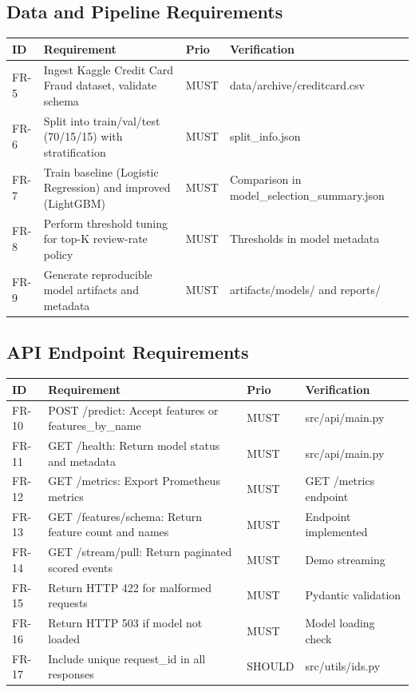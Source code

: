 \documentclass[12pt,a4paper]{article}
\begin{document}
\subsection{Data and Pipeline Requirements}

\begin{longtable}{|p{0.6cm}|p{3cm}|p{2cm}|p{3.5cm}|}
\hline
\textbf{ID} & \textbf{Requirement} & \textbf{Prio} & \textbf{Verification} \\
\hline
FR-5 & Ingest Kaggle Credit Card Fraud dataset, validate schema & MUST & data/archive/creditcard.csv \\
FR-6 & Split into train/val/test (70/15/15) with stratification & MUST & split\_info.json \\
FR-7 & Train baseline (Logistic Regression) and improved (LightGBM) & MUST & Comparison in model\_selection\_summary.json \\
FR-8 & Perform threshold tuning for top-K review-rate policy & MUST & Thresholds in model metadata \\
FR-9 & Generate reproducible model artifacts and metadata & MUST & artifacts/models/ and reports/ \\
\hline
\end{longtable}

\subsection{API Endpoint Requirements}

\begin{longtable}{|p{0.6cm}|p{3cm}|p{2cm}|p{3.5cm}|}
\hline
\textbf{ID} & \textbf{Requirement} & \textbf{Prio} & \textbf{Verification} \\
\hline
FR-10 & POST /predict: Accept features or features\_by\_name & MUST & src/api/main.py \\
FR-11 & GET /health: Return model status and metadata & MUST & src/api/main.py \\
FR-12 & GET /metrics: Export Prometheus metrics & MUST & GET /metrics endpoint \\
FR-13 & GET /features/schema: Return feature count and names & MUST & Endpoint implemented \\
FR-14 & GET /stream/pull: Return paginated scored events & MUST & Demo streaming \\
FR-15 & Return HTTP 422 for malformed requests & MUST & Pydantic validation \\
FR-16 & Return HTTP 503 if model not loaded & MUST & Model loading check \\
FR-17 & Include unique request\_id in all responses & SHOULD & src/utils/ids.py \\
\hline
\end{longtable}
\end{document}
